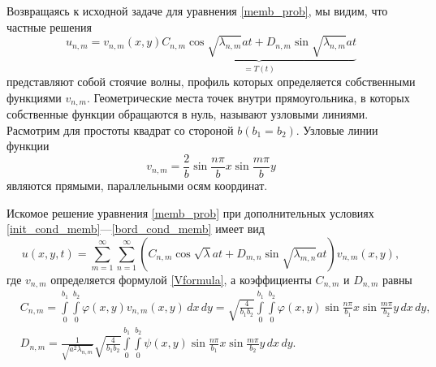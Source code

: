 Возвращаясь к исходной задаче для уравнения \eqref{memb_prob}, мы видим, что частные решения
\begin{equation}
	u_{n, m} = v_{n, m}(x, y) \underbrace{C_{n, m} \cos{\sqrt{\lambda_{n, m}} a t} + D_{n, m} \sin{\sqrt{\lambda_{n, m}} a t}}_{=T(t)}
\end{equation}
представляют собой стоячие волны, профиль которых определяется собственными функциями $v_{n, m}$. Геометрические места точек внутри прямоугольника, в которых собственные функции обращаются в нуль, называют узловыми линиями. Расмотрим для простоты квадрат со стороной $b (b_1 = b_2)$. Узловые линии функции 
\begin{equation}
	v_{n, m} = \frac{2}{b} \sin{\frac{n \pi}{b} x} \sin{\frac{m \pi}{b} y}
\end{equation}
являются прямыми, параллельными осям координат. 

Искомое решение уравнения \eqref{memb_prob} при дополнительных условиях \eqref{init_cond_memb}---\eqref{bord_cond_memb} имеет вид
\begin{equation*}
	u(x, y, t) = \sum \limits_{m = 1}^{\infty} \sum \limits_{n = 1}^{\infty} (C_{n, m} \cos{\sqrt{\lambda} a t} + D_{m, n} \sin{\sqrt{\lambda_{m, n}} a t}) v_{n, m}(x, y),
\end{equation*}
где $v_{n, m}$ определяется формулой \eqref{Vformula}, а коэффициенты $C_{n, m}$ и $D_{n, m}$ равны
\begin{align*}
	&C_{n, m} = \int \limits_{0}^{b_1} \int \limits_{0}^{b_2} \varphi(x, y) v_{n, m}(x, y) \, dx \, dy = \sqrt{\frac{4}{b_1 b_2}} \int \limits_{0}^{b_1} \int \limits_{0}^{b_2} \varphi(x, y) \sin{\frac{n \pi}{b_1} x} \sin{\frac{m \pi}{b_2} y} \, dx \, dy, \\
	&D_{n, m} = \frac{1}{\sqrt{a^2 \lambda_{n, m}}} \sqrt{\frac{4}{b_1 b_2}} \int \limits_{0}^{b_1} \int \limits_{0}^{b_2} \psi(x, y) \sin{\frac{n \pi}{b_1} x} \sin{\frac{m \pi}{b_2} y} \, dx \, dy. 
\end{align*}